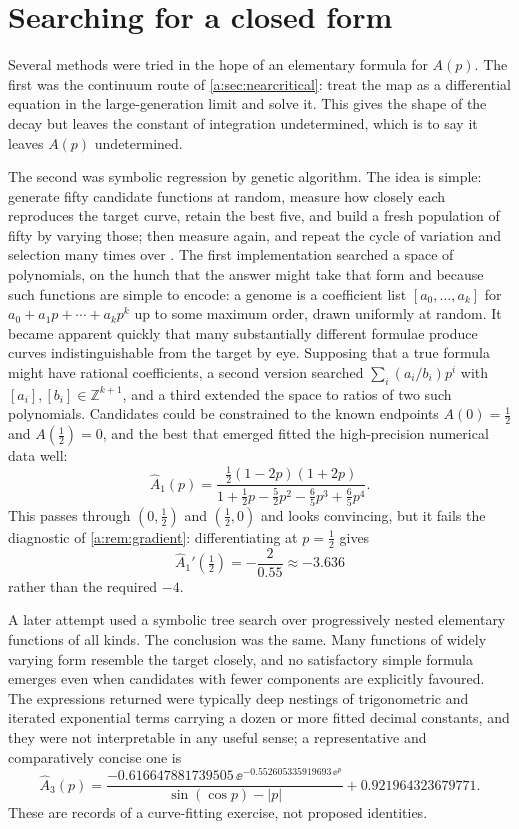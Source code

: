 \section{Searching for a closed form}
\label{a:sec:GA}

Several methods were tried in the hope of an elementary formula for $A(p)$. The
first was the continuum route of \cref{a:sec:nearcritical}: treat the map
as a differential equation in the large-generation limit and solve it. This gives
the shape of the decay but leaves the constant of integration undetermined, which
is to say it leaves $A(p)$ undetermined.

The second was symbolic regression by genetic algorithm. The idea is simple:
generate fifty candidate functions at random, measure how closely each reproduces
the target curve, retain the best five, and build a fresh population of fifty by
varying those; then measure again, and repeat the cycle of variation and selection
many times over \cite{stanley2002evolving,cohen2024physics}. The first
implementation searched a space of polynomials, on the hunch that the answer might
take that form and because such functions are simple to encode: a genome is a
coefficient list $[a_0,\dots,a_k]$ for $a_0+a_1p+\cdots+a_kp^k$ up to some maximum
order, drawn uniformly at random. It became apparent quickly that many
substantially different formulae produce curves indistinguishable from the target
by eye. Supposing that a true formula might have rational coefficients, a second
version searched $\sum_i(a_i/b_i)p^i$ with $[a_i],[b_i]\in\mathbb Z^{k+1}$, and a
third extended the space to ratios of two such polynomials. Candidates could be
constrained to the known endpoints $A(0)=\tfrac12$ and $A(\tfrac12)=0$, and the
best that emerged fitted the high-precision numerical data well:
\begin{equation}
\label{a:eq:A1hat}
\hat A_1(p) = \frac{\tfrac12(1-2p)(1+2p)}
{1+\tfrac12p-\tfrac52p^2-\tfrac65p^3+\tfrac65p^4} .
\end{equation}
This passes through $(0,\tfrac12)$ and $(\tfrac12,0)$ and looks convincing, but it
fails the diagnostic of \cref{a:rem:gradient}: differentiating at $p=\tfrac12$ gives
\begin{equation*}
\hat A_1'(\tfrac12) = -\frac{2}{0.55}\approx-3.636
\end{equation*}
rather than the required $-4$.

A later attempt used a symbolic tree search over progressively nested elementary
functions of all kinds. The conclusion was the same. Many functions of widely
varying form resemble the target closely, and no satisfactory simple formula
emerges even when candidates with fewer components are explicitly favoured. The
expressions returned were typically deep nestings of trigonometric and iterated
exponential terms carrying a dozen or more fitted decimal constants, and they were
not interpretable in any useful sense; a representative and comparatively concise
one is
\begin{equation}
\label{a:eq:A3hat}
\hat A_3(p) = \frac{-0.616647881739505\,\ee^{-0.552605335919693\,\ee^{p}}}
{\sin(\cos p)-|p|} + 0.921964323679771 .
\end{equation}
These are records of a curve-fitting exercise, not proposed identities.

